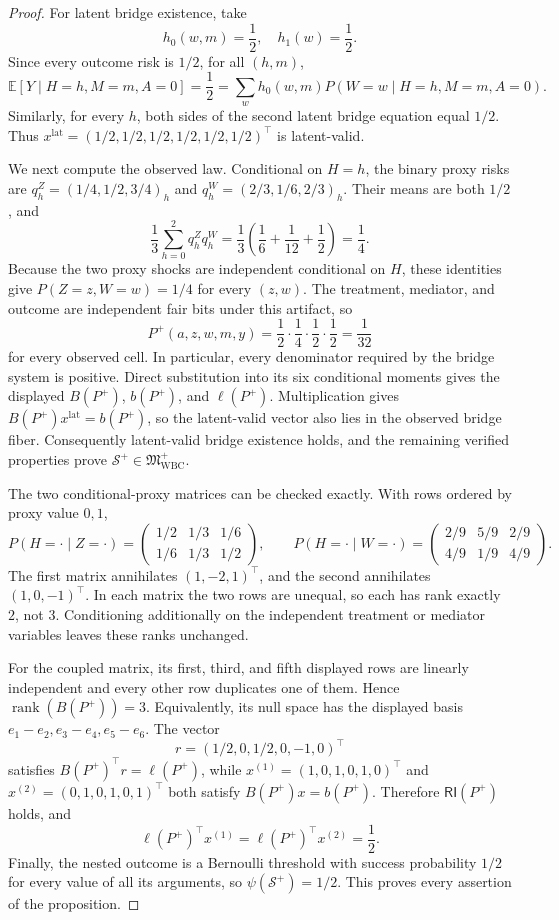 \documentclass{article}
\begin{document}
\begin{proof}
For latent bridge existence, take
\[
 h_0(w,m)=\frac12,\quad h_1(w)=\frac12.
\]
Since every outcome risk is \(1/2\), for all \((h,m)\),
\[
 \mathbb E[Y\mid H=h,M=m,A=0]=\frac12
 =\sum_w h_0(w,m)P(W=w\mid H=h,M=m,A=0).
\]
Similarly, for every \(h\), both sides of the second latent bridge equation equal
\(1/2\).  Thus \(x^{\mathrm{lat}}=(1/2,1/2,1/2,1/2,1/2,1/2)^\top\) is latent-valid.

We next compute the observed law.  Conditional on \(H=h\), the binary proxy risks
are \(q_h^Z=(1/4,1/2,3/4)_h\) and
\(q_h^W=(2/3,1/6,2/3)_h\).  Their means are both \(1/2\), and
\[
 \frac13\sum_{h=0}^2q_h^Zq_h^W
 =\frac13\left(\frac16+\frac1{12}+\frac12\right)=\frac14.
\]
Because the two proxy shocks are independent conditional on \(H\), these identities
give \(P(Z=z,W=w)=1/4\) for every \((z,w)\).  The treatment, mediator, and outcome
are independent fair bits under this artifact, so
\[
 P^+(a,z,w,m,y)=\frac12\cdot\frac14\cdot\frac12\cdot\frac12
 =\frac1{32}
\]
for every observed cell.  In particular, every denominator required by the bridge
system is positive.  Direct substitution into its six conditional moments gives
the displayed \(B(P^+)\), \(b(P^+)\), and \(\ell(P^+)\).  Multiplication gives
\(B(P^+)x^{\mathrm{lat}}=b(P^+)\), so the latent-valid vector also lies in the
observed bridge fiber.  Consequently latent-valid bridge existence holds, and the
remaining verified properties prove
\(\mathcal S^+\in\mathfrak M_{\mathrm{WBC}}^+\).

The two conditional-proxy matrices can be checked exactly.  With rows ordered by
proxy value \(0,1\),
\[
 P(H=\cdot\mid Z=\cdot)=
 \begin{pmatrix}1/2&1/3&1/6\\[2pt]1/6&1/3&1/2\end{pmatrix},
 \qquad
 P(H=\cdot\mid W=\cdot)=
 \begin{pmatrix}2/9&5/9&2/9\\[2pt]4/9&1/9&4/9\end{pmatrix}.
\]
The first matrix annihilates \((1,-2,1)^\top\), and the second annihilates
\((1,0,-1)^\top\).  In each matrix the two rows are unequal, so each has rank
exactly \(2\), not \(3\).  Conditioning additionally on the independent treatment
or mediator variables leaves these ranks unchanged.

For the coupled matrix, its first, third, and fifth displayed rows are linearly
independent and every other row duplicates one of them.  Hence
\(\operatorname{rank}(B(P^+))=3\).  Equivalently, its null space has the displayed
basis \(e_1-e_2,e_3-e_4,e_5-e_6\).  The vector
\[
 r=(1/2,0,1/2,0,-1,0)^\top
\]
satisfies \(B(P^+)^\top r=\ell(P^+)\), while
\(x^{(1)}=(1,0,1,0,1,0)^\top\) and
\(x^{(2)}=(0,1,0,1,0,1)^\top\) both satisfy \(B(P^+)x=b(P^+)\).  Therefore
\(\mathsf{RI}(P^+)\) holds, and
\[
 \ell(P^+)^\top x^{(1)}=\ell(P^+)^\top x^{(2)}=\frac12.
\]
Finally, the nested outcome is a Bernoulli threshold with success probability
\(1/2\) for every value of all its arguments, so
\(\psi(\mathcal S^+)=1/2\).  This proves every assertion of the proposition.
\end{proof}
\end{document}
